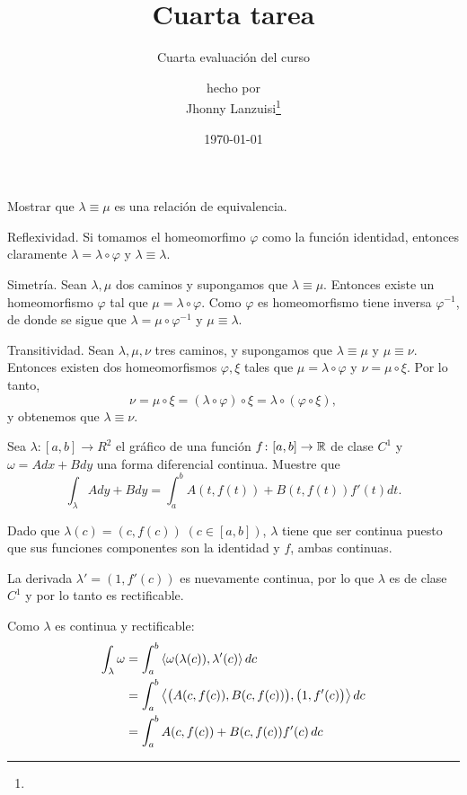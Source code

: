 \documentclass{scrartcl}
\begin{document}
%
\title{Cuarta tarea}
\subtitle{Cuarta evaluación del curso}
\subject{Análisis III}
\titlehead{Universidad Simón Bolívar\hfill Caracas, Venezuela}
\author{{\normalsize hecho por} \\ Jhonny Lanzuisi\footnote{\mycopyright}}
\date{\today}
\maketitle

\exercise
Mostrar que $λ ≡ μ$ es una relación de equivalencia.

\solution
Reflexividad. Si tomamos el homeomorfimo $\varphi$ como la función identidad,
entonces claramente $\lambda = \lambda\circ\varphi$ y $\lambda\equiv\lambda$.

Simetría. Sean $\lambda,\mu$ dos caminos y supongamos que $\lambda\equiv\mu$.
Entonces existe un homeomorfismo $\varphi$ tal que $\mu = \lambda\circ\varphi$.
Como $\varphi$ es homeomorfismo tiene inversa $\varphi^{-1}$, de donde se sigue que
$\lambda = \mu\circ\varphi^{-1}$ y $\mu\equiv\lambda$.

Transitividad. Sean $\lambda,\mu,\nu$ tres caminos, y supongamos que
$\lambda\equiv\mu$ y $\mu\equiv\nu$. Entonces existen dos homeomorfismos $\varphi,\xi$
tales que $\mu = \lambda\circ\varphi$ y $\nu = \mu\circ\xi$.
Por lo tanto,
$$
\nu = \mu\circ\xi = (\lambda\circ\varphi)\circ\xi = \lambda\circ(\varphi\circ\xi),
$$
y obtenemos que $\lambda\equiv\nu$.

\exercise
Sea $λ\colon [a, b] → R^2$ el gráfico de una función $f\colon [a,b]\to\mathbb{R}$ de clase $C^1$ y $\omega = Adx + Bdy$
una forma diferencial continua. Muestre que
$$
\int_\lambda Ady + Bdy = \int_a^b A(t,f(t)) + B(t,f(t)) f'(t) dt.
$$

\solution
Dado que $\lambda(c) = (c,f(c))\; (c\in[a,b])$, $\lambda$ tiene que ser continua
puesto que sus funciones componentes son la identidad y $f$, ambas continuas.

La derivada $\lambda' = (1,f'(c))$ es nuevamente continua, por lo que $\lambda$
es de clase $C^1$ y por lo tanto es rectificable.

Como $\lambda$ es continua y rectificable:
\begin{align*}
\int_\lambda \omega &= \int_a^b \left\langle \omega(\lambda(c)) , \lambda'(c) \right\rangle dc\\
					&= \int_a^b \left\langle \big(A(c,f(c)), B(c,f(c))\big) , \big(1,f'(c)\big) \right\rangle dc\\
					&= \int_a^b A(c,f(c)) + B(c,f(c)) f'(c)\, dc
\end{align*}
\end{document}
